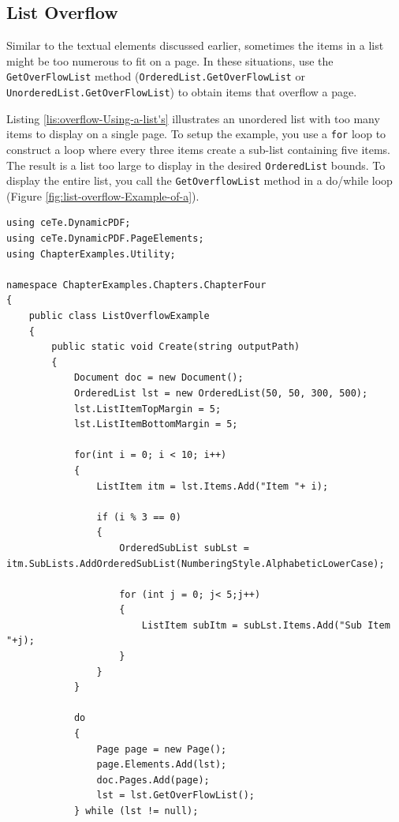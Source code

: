 \documentclass[american]{tufte-book}
\numberwithin{equation}{section}
\numberwithin{figure}{section}
\begin{document}
{{\subsection{List Overflow}

Similar to the textual elements discussed earlier, sometimes the items
in a list might be too numerous to fit on a page. In these situations,
use the \texttt{GetOverFlowList} method (\texttt{OrderedList.GetOverFlowList} or
\texttt{UnorderedList.GetOverFlowList}) to obtain items that overflow a page. 

Listing \ref{lis:overflow-Using-a-list's} illustrates an unordered
list with too many items to display on a single page. To setup the
example, you use a \texttt{for} loop to construct a
loop where every three items create a sub-list containing five items.
The result is a list too large to display in the desired \texttt{OrderedList}
bounds. To display the entire list, you call the \texttt{GetOverflowList}
method in a do/while loop (Figure \ref{fig:list-overflow-Example-of-a}).

\bgroup{}
\begin{lstlisting}[caption={Using a list's GetOverFlowList method.},label={lis:overflow-Using-a-list's},basicstyle={\footnotesize\ttfamily},breaklines=true]
using ceTe.DynamicPDF;
using ceTe.DynamicPDF.PageElements;
using ChapterExamples.Utility;

namespace ChapterExamples.Chapters.ChapterFour
{
    public class ListOverflowExample
    {
        public static void Create(string outputPath)
        {
            Document doc = new Document();
            OrderedList lst = new OrderedList(50, 50, 300, 500);
            lst.ListItemTopMargin = 5;
            lst.ListItemBottomMargin = 5;

            for(int i = 0; i < 10; i++)
            {
                ListItem itm = lst.Items.Add("Item "+ i);

                if (i % 3 == 0)
                {
                    OrderedSubList subLst = itm.SubLists.AddOrderedSubList(NumberingStyle.AlphabeticLowerCase);

                    for (int j = 0; j< 5;j++)
                    {
                        ListItem subItm = subLst.Items.Add("Sub Item "+j);
                    }
                }
            }
                       
            do
            {
                Page page = new Page();
                page.Elements.Add(lst);
                doc.Pages.Add(page);
                lst = lst.GetOverFlowList();
            } while (lst != null);


\end{lstlisting}}}
\end{document}
